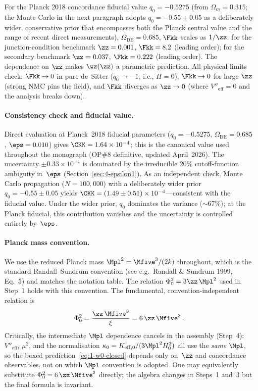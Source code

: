 For the Planck 2018 concordance fiducial value $q_0 = -0.5275$ (from $\Omega_m = 0.315$; the Monte Carlo in the next paragraph adopts $q_0 = -0.55 \pm 0.05$ as a deliberately wider, conservative prior that encompasses both the Planck central value and the range of recent direct measurements), $\Omega_{\mathrm{DE}} = 0.685$, $\Fkk$ scales as $1/\zz$: for the junction-condition benchmark $\zz = 0.001$, $\Fkk = 8.2$ (leading order); for the secondary benchmark $\zz = 0.037$, $\Fkk = 0.222$ (leading order). The dependence on $\zz$ makes $\wz(\zz)$ a parametric prediction. All physical limits check: $\Fkk \to 0$ in pure de~Sitter ($q_0 \to -1$, i.e., $\dot{H} = 0$), $\Fkk \to 0$ for large $\zz$ (strong NMC pins the field), and $\Fkk$ diverges as $\zz \to 0$ (where $V''_{\mathrm{eff}} = 0$ and the analysis breaks down).

\paragraph{Consistency check and fiducial value.} Direct evaluation at Planck~2018 fiducial parameters ($q_0 = -0.5275$, $\Omega_{\mathrm{DE}} = 0.685$, $\eps = 0.010$) gives $\CKK = 1.64 \times 10^{-4}$; this is the canonical value used throughout the monograph (OP\#8 definitive, updated April~2026). The uncertainty $\pm 0.33 \times 10^{-4}$ is dominated by the irreducible $20\%$ cutoff-function ambiguity in~$\eps$ (Section~\ref{sec:4-epsilon1}). As an independent check, Monte Carlo propagation ($N = 100{,}000$) with a deliberately wider prior $q_0 = -0.55 \pm 0.05$ yields $\CKK = (1.49 \pm 0.51) \times 10^{-4}$---consistent with the fiducial value. Under the wider prior, $q_0$ dominates the variance (${\sim}67\%$); at the Planck fiducial, this contribution vanishes and the uncertainty is controlled entirely by~$\eps$.

\paragraph{Planck mass convention.} We use the reduced Planck mass $\Mpl^2 = \Mfive^3/(2k)$ throughout, which is the standard Randall--Sundrum convention (see e.g.\ Randall \& Sundrum 1999, Eq.~5) and matches the notation table. The relation $\Phi_0^2 = 3\zz\,\Mpl^2$ used in Step~1 holds with this convention. The fundamental, convention-independent relation is
\begin{equation}
\label{eq:1-phi0-fundamental}
\Phi_0^2 = \frac{\zz\,\Mfive^3}{\xi} = 6\,\zz\,\Mfive^3\,.
\end{equation}
Critically, the intermediate $\Mpl$ dependence cancels in the assembly (Step~4): $V''_{\mathrm{eff}}$, $\mu^2$, and the normalisation $\kappa_0 = K_{\mathrm{eff},0}/(3\Mpl^2 H_0^2)$ all use the \emph{same} $\Mpl$, so the boxed prediction~\eqref{eq:1-w0-closed} depends only on~$\zz$ and concordance observables, not on which $\Mpl$ convention is adopted. One may equivalently substitute $\Phi_0^2 = 6\,\zz\,\Mfive^3$ directly; the algebra changes in Steps~1 and~3 but the final formula is invariant.

